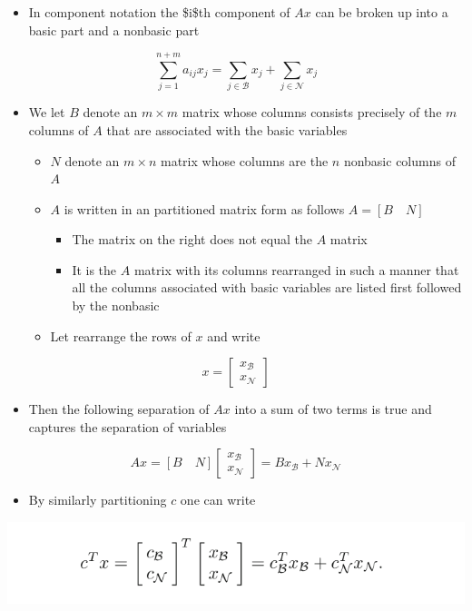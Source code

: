 \documentclass[11pt]{article}
\begin{document}
\begin{itemize}
\item In component notation the \$i\$th component of \(Ax\) can be broken up into a basic part and a nonbasic part
\end{itemize}
\begin{equation}
  \sum_{j=1}^{n+m}a_{ij}x_j = \sum_{j \in \mathcal B} x_j + \sum_{j \in \mathcal N} x_j 
\end{equation}	
\begin{itemize}
\item We let \(B\) denote an \(m \times m\) matrix whose columns consists precisely of the \(m\) columns of \(A\) that are associated with the basic variables
\begin{itemize}
\item \(N\) denote an \(m \times n\) matrix whose columns are the \(n\) nonbasic columns of \(A\)
\item \(A\) is written in an partitioned matrix form as follows \(A= [B \quad N]\)
\begin{itemize}
\item The matrix on the right does not equal the \(A\) matrix
\item It is the \(A\) matrix with its columns rearranged in such a manner that all the columns associated with basic variables are listed first followed by the nonbasic
\end{itemize}
\item Let rearrange the rows of \(x\) and write
\end{itemize}
\end{itemize}
\begin{equation}
	x = 
	\begin{bmatrix}
		x_{\mathcal B} \\ x_{\mathcal N}
	\end{bmatrix}
\end{equation}
\begin{itemize}
\item Then the following separation of \(Ax\) into a sum of two terms is true and captures the separation of variables
\end{itemize}
\begin{equation}
  Ax = [B \quad N]
	\begin{bmatrix}
		x_{\mathcal B} \\ x_{\mathcal N}
	\end{bmatrix}
	= B x_{\mathcal B} + N x_{\mathcal N}
\end{equation}
\begin{itemize}
\item By similarly partitioning \(c\) one can write
\end{itemize}
\begin{center}
\includegraphics[width=.9\linewidth]{The Simplex Method in Matrix Notation/screenshot_2019-02-11_16-13-39.png}
\end{center}
\end{document}
